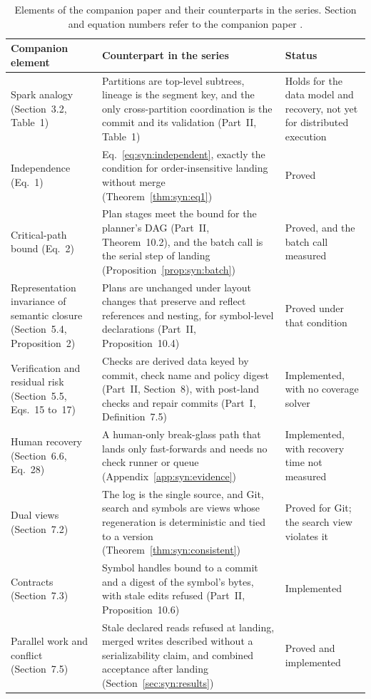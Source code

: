 \documentclass[11pt,letterpaper]{article}
\theoremstyle{definition}
\theoremstyle{remark}
\begin{document}
\begin{table}[t]
\centering
\small
\caption{Elements of the companion paper and their counterparts in the series. Section and equation numbers refer to the companion paper \cite{long2026inversion}.}
\label{tab:syn:companion}
\begin{tabularx}{\textwidth}{@{}L{3.3cm}YL{3.0cm}@{}}
\toprule
Companion element & Counterpart in the series & Status \\
\midrule
Spark analogy (Section~3.2, Table~1) & Partitions are top-level subtrees, lineage is the segment key, and the only cross-partition coordination is the commit and its validation (Part~II, Table~1) & Holds for the data model and recovery, not yet for distributed execution \\
Independence (Eq.~1) & Eq.~\eqref{eq:syn:independent}, exactly the condition for order-insensitive landing without merge (Theorem~\ref{thm:syn:eq1}) & Proved \\
Critical-path bound (Eq.~2) & Plan stages meet the bound for the planner's DAG (Part~II, Theorem~10.2), and the batch call is the serial step of landing (Proposition~\ref{prop:syn:batch}) & Proved, and the batch call measured \\
Representation invariance of semantic closure (Section~5.4, Proposition~2) & Plans are unchanged under layout changes that preserve and reflect references and nesting, for symbol-level declarations (Part~II, Proposition~10.4) & Proved under that condition \\
Verification and residual risk (Section~5.5, Eqs.~15 to~17) & Checks are derived data keyed by commit, check name and policy digest (Part~II, Section~8), with post-land checks and repair commits (Part~I, Definition~7.5) & Implemented, with no coverage solver \\
Human recovery (Section~6.6, Eq.~28) & A human-only break-glass path that lands only fast-forwards and needs no check runner or queue (Appendix~\ref{app:syn:evidence}) & Implemented, with recovery time not measured \\
Dual views (Section~7.2) & The log is the single source, and Git, search and symbols are views whose regeneration is deterministic and tied to a version (Theorem~\ref{thm:syn:consistent}) & Proved for Git; the search view violates it \\
Contracts (Section~7.3) & Symbol handles bound to a commit and a digest of the symbol's bytes, with stale edits refused (Part~II, Proposition~10.6) & Implemented \\
Parallel work and conflict (Section~7.5) & Stale declared reads refused at landing, merged writes described without a serializability claim, and combined acceptance after landing (Section~\ref{sec:syn:results}) & Proved and implemented \\
\bottomrule
\end{tabularx}
\end{table}
\end{document}
